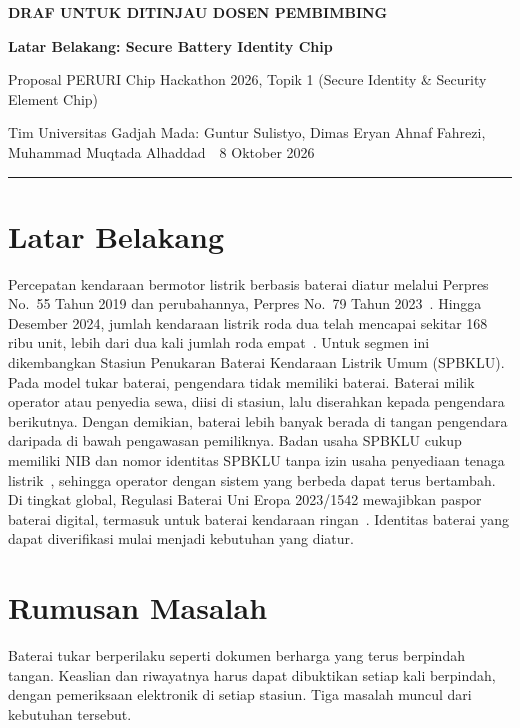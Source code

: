 \documentclass[11pt,a4paper]{article}
\begin{document}
{\footnotesize\bfseries\color{secline} DRAF UNTUK DITINJAU DOSEN PEMBIMBING\par}
\vspace{4pt}
{\LARGE\bfseries\color{ink} Latar Belakang: Secure Battery Identity Chip\par}
\vspace{4pt}
{\small\color{subtle} Proposal PERURI Chip Hackathon 2026, Topik 1 (Secure Identity \& Security Element Chip)\par}
{\small\color{subtle} Tim Universitas Gadjah Mada: Guntur Sulistyo, Dimas Eryan Ahnaf Fahrezi, Muhammad Muqtada Alhaddad \,\textperiodcentered\, 8 Oktober 2026\par}
\vspace{2pt}
{\color{subtle!50}\rule{\linewidth}{0.4pt}\par}

\section{Latar Belakang}

Percepatan kendaraan bermotor listrik berbasis baterai diatur melalui Perpres No.~55 Tahun 2019 dan perubahannya, Perpres No.~79 Tahun 2023~\cite{perpres55,perpres79}. Hingga Desember 2024, jumlah kendaraan listrik roda dua telah mencapai sekitar 168 ribu unit, lebih dari dua kali jumlah roda empat~\cite{ruptl}. Untuk segmen ini dikembangkan Stasiun Penukaran Baterai Kendaraan Listrik Umum (SPBKLU). Pada model tukar baterai, pengendara tidak memiliki baterai. Baterai milik operator atau penyedia sewa, diisi di stasiun, lalu diserahkan kepada pengendara berikutnya. Dengan demikian, baterai lebih banyak berada di tangan pengendara daripada di bawah pengawasan pemiliknya. Badan usaha SPBKLU cukup memiliki NIB dan nomor identitas SPBKLU tanpa izin usaha penyediaan tenaga listrik~\cite{rukn}, sehingga operator dengan sistem yang berbeda dapat terus bertambah. Di tingkat global, Regulasi Baterai Uni Eropa 2023/1542 mewajibkan paspor baterai digital, termasuk untuk baterai kendaraan ringan~\cite{eubat}. Identitas baterai yang dapat diverifikasi mulai menjadi kebutuhan yang diatur.

\section{Rumusan Masalah}

Baterai tukar berperilaku seperti dokumen berharga yang terus berpindah tangan. Keaslian dan riwayatnya harus dapat dibuktikan setiap kali berpindah, dengan pemeriksaan elektronik di setiap stasiun. Tiga masalah muncul dari kebutuhan tersebut.
\end{document}

